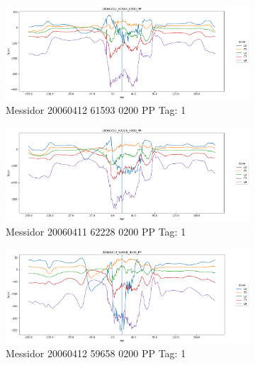 \begin{figure}[ht!]
	\centering
	\begin{subfigure}[b]{ 0.85\textwidth}
		\centering
		\includegraphics[width=\textwidth]{Figures/chapter_stability/20060412_61593_0200_PP/h/scores.png}
		\caption{Messidor 20060412 61593 0200 PP Tag: 1}
	\end{subfigure}
	\begin{subfigure}[b]{ 0.85\textwidth}
		\centering
		\includegraphics[width=\textwidth]{Figures/chapter_stability/20060411_62228_0200_PP/h/scores.png}
		\caption{Messidor 20060411 62228 0200 PP Tag: 1}		
	\end{subfigure}	
	\begin{subfigure}[b]{ 0.85\textwidth}
		\centering
		\includegraphics[width=\textwidth]{Figures/chapter_stability/20060412_59658_0200_PP/h/scores.png}
		\caption{Messidor 20060412 59658 0200 PP Tag: 1}		
	\end{subfigure}
	\begin{subfigure}[b]{ 0.85\textwidth}

\end{subfigure}
\end{figure}
